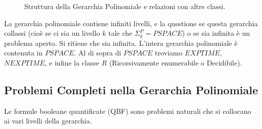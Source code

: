 \documentclass[a4paper]{article}
\begin{document}
\begin{figure}[h]
    \caption{Struttura della Gerarchia Polinomiale e relazioni con altre classi.}
    \label{fig:polynomial_hierarchy}
\end{figure}

La gerarchia polinomiale contiene infiniti livelli, e la questione se questa gerarchia collassi (cioè se ci sia un livello $k$ tale che $\Sigma_k^P = PSPACE$) o se sia infinita è un problema aperto. Si ritiene che sia infinita. L'intera gerarchia polinomiale è contenuta in $PSPACE$. Al di sopra di $PSPACE$ troviamo $EXPTIME$, $NEXPTIME$, e infine la classe $R$ (Ricorsivamente enumerabile o Decidibile).

\subsection{Problemi Completi nella Gerarchia Polinomiale}
Le formule booleane quantificate (QBF) sono problemi naturali che si collocano ai vari livelli della gerarchia.
\end{document}
